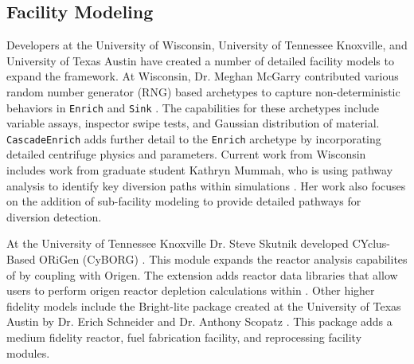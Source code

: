 \subsection{Facility Modeling}
Developers at the University of Wisconsin, University of Tennessee Knoxville, and University of Texas Austin have created a number of detailed facility models to expand the \Cyclus framework. At Wisconsin, Dr. Meghan McGarry contributed various random number generator (RNG) based archetypes to capture non-deterministic behaviors in \texttt{Enrich} and \texttt{Sink} \cite{mcgarry_mbmore_2017}. The capabilities for these archetypes include variable assays, inspector swipe tests, and Gaussian distribution of material. \texttt{CascadeEnrich} adds further detail to the \texttt{Enrich} archetype by incorporating detailed centrifuge physics and parameters. Current work from Wisconsin includes work from graduate student Kathryn Mummah, who is using pathway analysis to identify key diversion paths within \Cyclus simulations \cite{mummah_material_2019}. Her work
also focuses on the addition of sub-facility modeling to provide detailed pathways for diversion detection.

At the University of Tennessee Knoxville Dr. Steve Skutnik developed CYclus-Based ORiGen (CyBORG) \cite{skutnik_cyborg:_2016}. This module expands the reactor analysis capabilites of \Cyclus by coupling with Origen. The extension adds reactor data libraries that allow users to perform origen
reactor depletion calculations within \Cyclus. Other higher fidelity models include the Bright-lite package created at the University of Texas Austin by Dr. Erich Schneider and Dr. Anthony Scopatz \cite{schneider_integrated_2016}. This package adds a medium fidelity reactor, fuel fabrication facility, and reprocessing facility modules.


